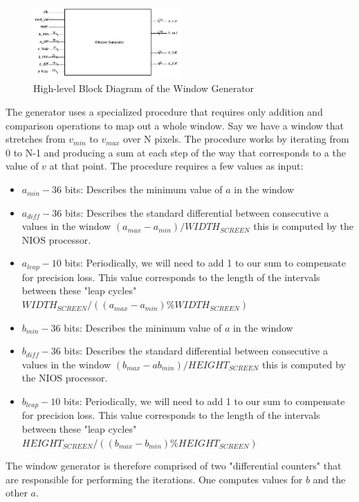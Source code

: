\documentclass{article}
\begin{document}
\begin{figure}[H]
  \centering
    \includegraphics[width=160pt]{block_diagrams/win_gen.pdf}
  \caption{High-level Block Diagram of the Window Generator}
\end{figure}


The generator uses a specialized procedure that requires only addition and comparison
operations to map out a whole window. Say we have a window that stretches from $v_{min}$ to $v_{max}$ over
N pixels. The procedure works by iterating from 0 to N-1 and producing a sum at each step of the way that
corresponds to a the value of $v$ at that point. The procedure requires a few values as input:


\begin{itemize}
\item $a_{min} - 36$ bits: Describes the minimum value of $a$ in the window
\item $a_{diff} - 36$ bits: Describes the standard differential between consecutive a values in the window $(a_{max} - a_{min})/WIDTH_{SCREEN}$ this is computed by the NIOS processor.
\item $a_{leap} - 10$ bits: Periodically, we will need to add 1 to our sum to compensate for precision loss. This value
corresponds to the length of the intervals between these "leap cycles" $WIDTH_{SCREEN}/((a_{max} - a_{min})\%WIDTH_{SCREEN})$
\item $b_{min} - 36$ bits: Describes the minimum value of $a$ in the window
\item $b_{diff} - 36$ bits: Describes the standard differential between consecutive a values in the window $(b_{max} - ab_{min})/HEIGHT_{SCREEN}$ this is computed by the NIOS processor.
\item $b_{leap} - 10$ bits: Periodically, we will need to add 1 to our sum to compensate for precision loss. This value
corresponds to the length of the intervals between these "leap cycles" $HEIGHT_{SCREEN}/((b_{max} - b_{min})\%HEIGHT_{SCREEN})$
\end{itemize}

The window generator is therefore comprised of two "differential counters" that are responsible for performing the 
iterations. One computes values for $b$ and the other $a$. 
\end{document}
